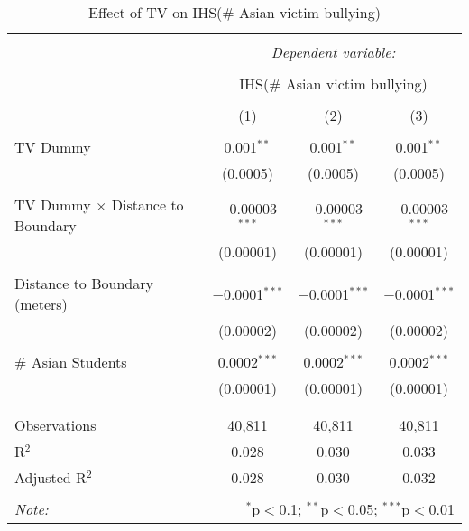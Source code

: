 
\begin{table}[!htbp] \centering 
  \caption{Effect of TV on IHS(\# Asian victim bullying)} 
  \label{} 
\begin{tabular}{@{\extracolsep{-2pt}}lccc} 
\\[-1.8ex]\hline 
\hline \\[-1.8ex] 
 & \multicolumn{3}{c}{\textit{Dependent variable:}} \\ 
\cline{2-4} 
\\[-1.8ex] & \multicolumn{3}{c}{IHS(\# Asian victim bullying)} \\ 
\\[-1.8ex] & (1) & (2) & (3)\\ 
\hline \\[-1.8ex] 
 TV Dummy & 0.001$^{**}$ & 0.001$^{**}$ & 0.001$^{**}$ \\ 
  & (0.0005) & (0.0005) & (0.0005) \\ 
  & & & \\ 
 TV Dummy $\times$ Distance to Boundary & $-$0.00003$^{***}$ & $-$0.00003$^{***}$ & $-$0.00003$^{***}$ \\ 
  & (0.00001) & (0.00001) & (0.00001) \\ 
  & & & \\ 
 Distance to Boundary (meters) & $-$0.0001$^{***}$ & $-$0.0001$^{***}$ & $-$0.0001$^{***}$ \\ 
  & (0.00002) & (0.00002) & (0.00002) \\ 
  & & & \\ 
 \# Asian Students & 0.0002$^{***}$ & 0.0002$^{***}$ & 0.0002$^{***}$ \\ 
  & (0.00001) & (0.00001) & (0.00001) \\ 
  & & & \\ 
\hline \\[-1.8ex] 
Observations & 40,811 & 40,811 & 40,811 \\ 
R$^{2}$ & 0.028 & 0.030 & 0.033 \\ 
Adjusted R$^{2}$ & 0.028 & 0.030 & 0.032 \\ 
\hline 
\hline \\[-1.8ex] 
\textit{Note:}  & \multicolumn{3}{r}{$^{*}$p$<$0.1; $^{**}$p$<$0.05; $^{***}$p$<$0.01} \\ 
\end{tabular} 
\end{table} 
